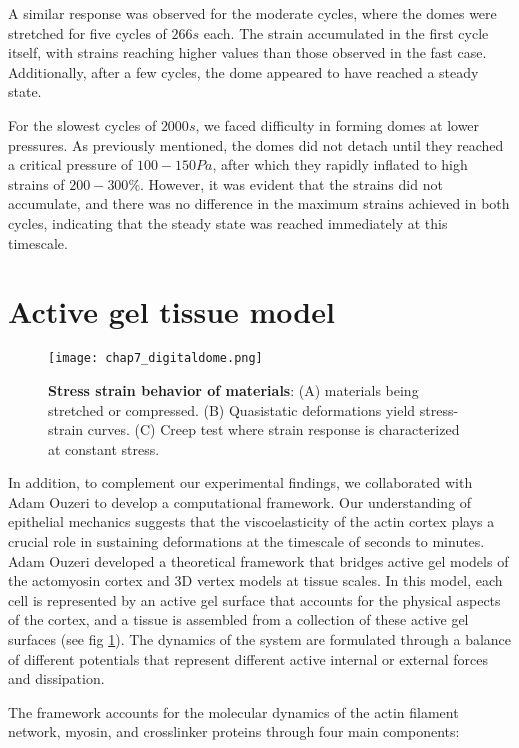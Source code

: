 A similar response was observed for the moderate cycles, where the domes were stretched for five cycles of $266 s$ each. The strain accumulated in the first cycle itself, with strains reaching higher values than those observed in the fast case. Additionally, after a few cycles, the dome appeared to have reached a steady state.

For the slowest cycles of $2000 s$, we faced difficulty in forming domes at lower pressures. As previously mentioned, the domes did not detach until they reached a critical pressure of $100-150 Pa$, after which they rapidly inflated to high strains of $200-300\%$. However, it was evident that the strains did not accumulate, and there was no difference in the maximum strains achieved in both cycles, indicating that the steady state was reached immediately at this timescale.




\hypertarget{active-gel-tissue-model}{%
	\section{Active gel tissue model}\label{active-gel-tissue-model}}


\begin{figure} [h!]
	\centering
	\texttt{[image: chap7\_digitaldome.png]}
	\caption{\label{fig_7_2} \textbf{Stress strain behavior of materials}: (A) materials being stretched or compressed. (B) Quasistatic deformations yield stress-strain curves. (C) Creep test where strain response is characterized at constant stress.
	}
\end{figure}

In addition, to complement our experimental findings, we collaborated with Adam Ouzeri to develop a computational framework. Our understanding of epithelial mechanics suggests that the viscoelasticity of the actin cortex plays a crucial role in sustaining deformations at the timescale of seconds to minutes. Adam Ouzeri developed a theoretical framework that bridges active gel models of the actomyosin cortex and 3D vertex models at tissue scales. In this model, each cell is represented by an active gel surface that accounts for the physical aspects of the cortex, and a tissue is assembled from a collection of these active gel surfaces (see fig \ref{fig_7_2}). The dynamics of the system are formulated through a balance of different potentials that represent different active internal or external forces and dissipation.

The framework accounts for the molecular dynamics of the actin filament network, myosin, and crosslinker proteins through four main components:

